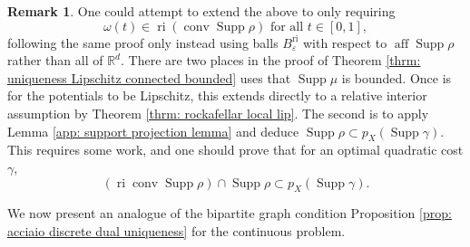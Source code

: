 \documentclass[11pt, oneside, titlepage]{book}
\theoremstyle{plain}
\theoremstyle{definition}
\newtheorem{remark}[theorem]{Remark}
\newcommand{\R}{\mathbb{R}}
\DeclareMathOperator{\ri}{ri}
\DeclareMathOperator{\aff}{aff}
\DeclareMathOperator{\conv}{conv}
\DeclareMathOperator{\supp}{Supp}
\begin{document}
\begin{remark}
 One could attempt to extend the above to only requiring 
\begin{equation*}
    \omega(t) \in \ri (\conv \supp \rho) \text{ for all } t \in [0, 1],
\end{equation*}
following the same proof only instead using balls $B^\text{ri}_\varepsilon$ with respect to $\aff\supp \rho$ rather than all of $\R^d$. There are two places in the proof of Theorem \ref{thrm: uniqueness Lipschitz connected bounded} uses that $\supp \mu$ is bounded. Once is for the potentials to be Lipschitz, this extends directly to a relative interior assumption by Theorem \ref{thrm: rockafellar local lip}. The second is to apply Lemma \ref{app: support projection lemma} and deduce $\supp \rho \subset p_X(\supp \gamma)$. This requires some work, and one should prove that for an optimal quadratic cost $\gamma$,
\begin{equation*}
    (\ri \conv \supp \rho) \cap \supp \rho \subset p_X(\supp \gamma).
\end{equation*}
\end{remark}


We now present an analogue of the bipartite graph condition Proposition \ref{prop: acciaio discrete dual uniqueness} for the continuous problem.
\end{document}

